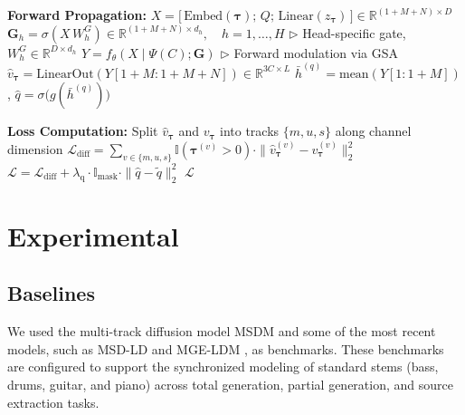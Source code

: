 \documentclass[lettersize,journal]{IEEEtran}
\begin{document}
\begin{algorithm}[t]
\begin{algorithmic}[1]
\item[] \textbf{Forward Propagation:}
\STATE $X = \big[\, \mathrm{Embed}(\boldsymbol{\tau}); \, Q; \, \mathrm{Linear}(z_{\boldsymbol{\tau}}) \,\big] \in \mathbb{R}^{(1 + M + N) \times D}$
\STATE $\mathbf{G}_h = \sigma(X \, W^G_h) \in \mathbb{R}^{(1+M+N) \times d_h}, \quad h = 1,\ldots,H$ \hfill $\triangleright$ Head-specific gate, $W^G_h \in \mathbb{R}^{D \times d_h}$
\STATE $Y = f_\theta(X \mid \Psi(C); \mathbf{G})$ \hfill $\triangleright$ Forward modulation via GSA
\STATE $\hat{v}_{\boldsymbol{\tau}} = \mathrm{LinearOut}(Y[1+M : 1+M+N]) \in \mathbb{R}^{3C \times L}$
\STATE $\bar{h}^{(q)} = \mathrm{mean}(Y[1 : 1+M])$, \quad $\hat{q} = \sigma\big(g(\bar{h}^{(q)})\big)$

\item[] \textbf{Loss Computation:}
\STATE Split $\hat{v}_{\boldsymbol{\tau}}$ and $v_{\boldsymbol{\tau}}$ into tracks $\{m, u, s\}$ along channel dimension
\STATE $\mathcal{L}_{\mathrm{diff}} = \sum_{v \in \{m,u,s\}} \mathbb{I}(\boldsymbol{\tau}^{(v)} > 0) \cdot \|\hat{v}_{\boldsymbol{\tau}}^{(v)} - v_{\boldsymbol{\tau}}^{(v)}\|_2^2$
\STATE $\mathcal{L} = \mathcal{L}_{\mathrm{diff}} + \lambda_{\mathrm{q}} \cdot \mathbb{I}_{\mathrm{mask}} \cdot \|\hat{q} - \tilde{q}\|_2^2$
\RETURN $\mathcal{L}$
\end{algorithmic}
\end{algorithm}

\section{Experimental}
\subsection{Baselines}
We used the multi-track diffusion model MSDM \cite{mariani2023multi} and some of the most recent models, such as MSD-LD \cite{karchkhadze2025simultaneous} and MGE-LDM \cite{chae2025mge}, as benchmarks. These benchmarks are configured to support the synchronized modeling of standard stems (bass, drums, guitar, and piano) across total generation, partial generation, and source extraction tasks. 
\end{document}
